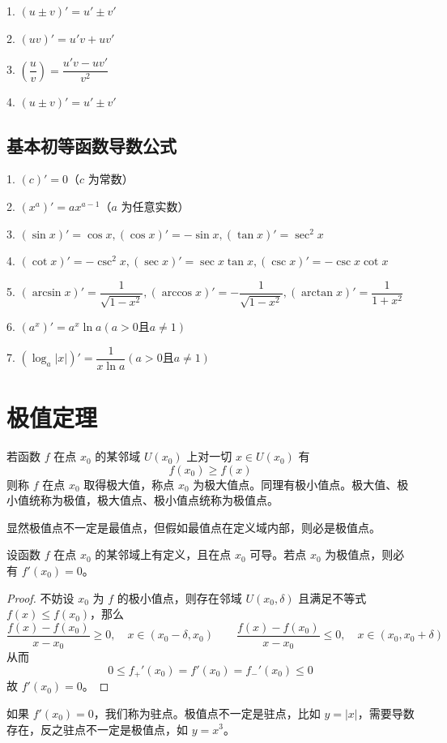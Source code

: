 1. $(u\pm v)' = u'\pm v'$

2. $(uv)' = u'v+uv'$

3. $\left(\dfrac{u}{v}\right) = \dfrac{u'v-uv'}{v^2}$

4. $(u\pm v)' = u'\pm v'$

\subsection{基本初等函数导数公式}

1. $(c)' = 0$（$c$ 为常数）

2. $(x^a)' = ax^{a-1}$（$a$ 为任意实数）

3. $(\sin x)' = \cos x,(\cos x)'=-\sin x,(\tan x)'=\sec^2x$

4. $(\cot x)' = -\csc^2 x,(\sec x)'=\sec x \tan x,(\csc x)'=-\csc x \cot x$

5. $(\arcsin x)'=\dfrac{1}{\sqrt{1-x^2}},(\arccos x)' = -\dfrac{1}{\sqrt{1-x^2}},(\arctan x)'=\dfrac{1}{1+x^2}$

6. $(a^x)'=a^x \ln a(a>0\text{且}a\ne 1)$

7. $(\log_a|x|)'=\dfrac{1}{x\ln a}(a>0\text{且}a\ne 1)$

\section{极值定理}

若函数 $f$ 在点 $x_0$ 的某邻域 $U(x_0)$ 上对一切 $x\in U(x_0)$ 有
\[ f(x_0) \geqslant f(x) \]
则称 $f$ 在点 $x_0$ 取得极大值，称点 $x_0$ 为极大值点。同理有极小值点。极大值、极小值统称为极值，极大值点、极小值点统称为极值点。

显然极值点不一定是最值点，但假如最值点在定义域内部，则必是极值点。

\begin{theorem}[Fermat 定理]
	设函数 $f$ 在点 $x_0$ 的某邻域上有定义，且在点 $x_0$ 可导。若点 $x_0$ 为极值点，则必有 $f'(x_0)=0$。
\end{theorem}

\begin{proof}
	不妨设 $x_0$ 为 $f$ 的极小值点，则存在邻域 $U(x_0, \delta)$ 且满足不等式 $f(x) \leqslant f(x_0)$，那么
	\[ \frac{f(x) - f(x_0)}{x - x_0} \geqslant 0, \quad x \in (x_0 - \delta, x_0) \qquad
		\frac{f(x) - f(x_0)}{x - x_0} \leqslant 0, \quad x \in (x_0, x_0 + \delta) \]
	从而
	\[ 0 \leqslant f_+'(x_0) = f'(x_0) = f_-'(x_0) \leqslant 0 \]
	故 $f'(x_0) = 0$。
\end{proof}

如果 $f'(x_0) = 0$，我们称为驻点。极值点不一定是驻点，比如 $y = |x|$，需要导数存在，反之驻点不一定是极值点，如 $y = x^3$。

